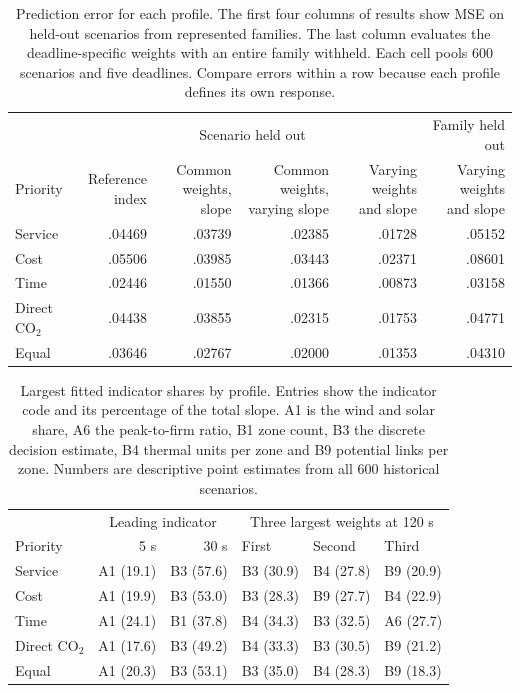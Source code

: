 \documentclass[11pt,a4paper]{article}
\newcommand{\CO}{CO$_2$}
\newcommand{\tablefont}{\small\renewcommand{\arraystretch}{1.14}}
\begin{document}
\begin{table}[H]\centering\tablefont
\caption{Prediction error for each profile. The first four columns of results show MSE on held-out scenarios from represented families. The last column evaluates the deadline-specific weights with an entire family withheld. Each cell pools 600 scenarios and five deadlines. Compare errors within a row because each profile defines its own response.}\label{tab:mse}
\begin{tabular}{@{}lrrrrr@{}}\toprule
& \multicolumn{4}{c}{Scenario held out} & Family held out\\
\cmidrule(lr){2-5}\cmidrule(l){6-6}
Priority & \shortstack{Reference\\index} & \shortstack{Common\\weights, slope} & \shortstack{Common weights,\\varying slope} & \shortstack{Varying weights\\and slope} & \shortstack{Varying weights\\and slope}\\\midrule
Service       & .04469 & .03739 & .02385 & .01728 & .05152\\
Cost          & .05506 & .03985 & .03443 & .02371 & .08601\\
Time          & .02446 & .01550 & .01366 & .00873 & .03158\\
Direct \CO    & .04438 & .03855 & .02315 & .01753 & .04771\\
Equal         & .03646 & .02767 & .02000 & .01353 & .04310\\
\bottomrule\end{tabular}
\end{table}

\begin{table}[H]\centering\tablefont
\caption{Largest fitted indicator shares by profile. Entries show the indicator code and its percentage of the total slope. A1 is the wind and solar share, A6 the peak-to-firm ratio, B1 zone count, B3 the discrete decision estimate, B4 thermal units per zone and B9 potential links per zone. Numbers are descriptive point estimates from all 600 historical scenarios.}\label{tab:weights}
\begin{tabular}{@{}lrrlll@{}}\toprule
& \multicolumn{2}{c}{Leading indicator} & \multicolumn{3}{c}{Three largest weights at 120 s}\\
\cmidrule(lr){2-3}\cmidrule(l){4-6}
Priority & 5 s & 30 s & First & Second & Third\\\midrule
Service & A1 (19.1) & B3 (57.6) & B3 (30.9) & B4 (27.8) & B9 (20.9)\\
Cost    & A1 (19.9) & B3 (53.0) & B3 (28.3) & B9 (27.7) & B4 (22.9)\\
Time    & A1 (24.1) & B1 (37.8) & B4 (34.3) & B3 (32.5) & A6 (27.7)\\
Direct \CO & A1 (17.6) & B3 (49.2) & B4 (33.3) & B3 (30.5) & B9 (21.2)\\
Equal   & A1 (20.3) & B3 (53.1) & B3 (35.0) & B4 (28.3) & B9 (18.3)\\
\bottomrule\end{tabular}
\end{table}
\end{document}
